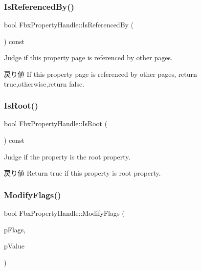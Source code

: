 \subsubsection{\texorpdfstring{Is\+Referenced\+By()}{IsReferencedBy()}}
{\footnotesize\ttfamily bool Fbx\+Property\+Handle\+::\+Is\+Referenced\+By (\begin{DoxyParamCaption}\item[{void}]{ }\end{DoxyParamCaption}) const}

Judge if this property page is referenced by other pages. \begin{DoxyReturn}{戻り値}
If this property page is referenced by other pages, return true,otherwise,return false. 
\end{DoxyReturn}
\mbox{\label{class_fbx_property_handle_ab1da9089aefb10740cdb3aad0754d200}} 
\subsubsection{\texorpdfstring{Is\+Root()}{IsRoot()}}
{\footnotesize\ttfamily bool Fbx\+Property\+Handle\+::\+Is\+Root (\begin{DoxyParamCaption}{ }\end{DoxyParamCaption}) const}

Judge if the property is the root property. \begin{DoxyReturn}{戻り値}
Return true if this property is root property. 
\end{DoxyReturn}
\mbox{\label{class_fbx_property_handle_aa5f4add93321ecbb6afb016bbf9ecc21}} 
\subsubsection{\texorpdfstring{Modify\+Flags()}{ModifyFlags()}}
{\footnotesize\ttfamily bool Fbx\+Property\+Handle\+::\+Modify\+Flags (\begin{DoxyParamCaption}\item[{\hyperlink{class_fbx_property_flags_afabfa7e0949aac8a7dcdf8a141867e99}{Fbx\+Property\+Flags\+::\+E\+Flags}}]{p\+Flags,  }\item[{bool}]{p\+Value }\end{DoxyParamCaption})}

